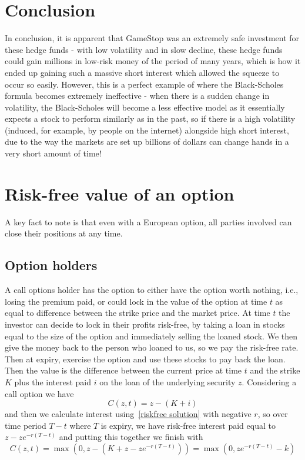 \documentclass[11pt]{article} %
\begin{document}
\section{Conclusion}
In conclusion, it is apparent that GameStop was an extremely safe investment 
for these hedge funds - with low volatility and in slow decline, these hedge 
funds could gain millions in low-risk money of the period of many years, which 
is how it ended up gaining such a massive short interest which allowed the 
squeeze to occur so easily. However, this is a perfect example of where 
the Black-Scholes formula becomes extremely ineffective - when there is a 
sudden change in volatility, the Black-Scholes will become a less effective 
model as it essentially expects a stock to perform similarly as in the past, 
so if there is a high volatility (induced, for example, by people on the 
internet) alongside high short interest, due to the way the markets are 
set up billions of dollars can change hands in a very short amount of time!

\printbibliography%

\appendix

\section{Risk-free value of an option}\label{riskfreevalue}
A key fact to note is that even with a 
European option, all parties involved can close their positions at any time. 
\subsection*{Option holders}
A call options holder has the option to either have the option worth nothing, i.e., 
losing the premium paid, or could lock in the value of the option at time $t$ as 
equal to difference between the strike price and the market price. At time $t$ the 
investor can decide to lock in their profits risk-free, by taking a loan in stocks 
equal to the size of the option and immediately selling the loaned stock. We then give 
the money back to the person who loaned to us, so we pay the risk-free rate. Then at 
expiry, exercise the option and use these stocks to pay back the loan. Then the value is 
the difference between the current price at time $t$ and the strike $K$ plus the 
interest paid $i$ on the loan of the underlying security 
$z$. Considering a call option we have 
 \[C(z,t) = z - (K + i)\]
 and then we calculate interest using~\eqref{riskfree solution} with negative $r$, so 
 over time period $T-t$ where $T$ is expiry, we have risk-free interest paid equal to 
 $z - ze^{-r(T-t)}$ 
 and putting this together we finish with 
 \[
C(z,t) =\max{(0, z - (K + z - ze^{-r(T-t)}))} = \max{(0, ze^{-r(T-t)} - k)}
 \]
\end{document}
